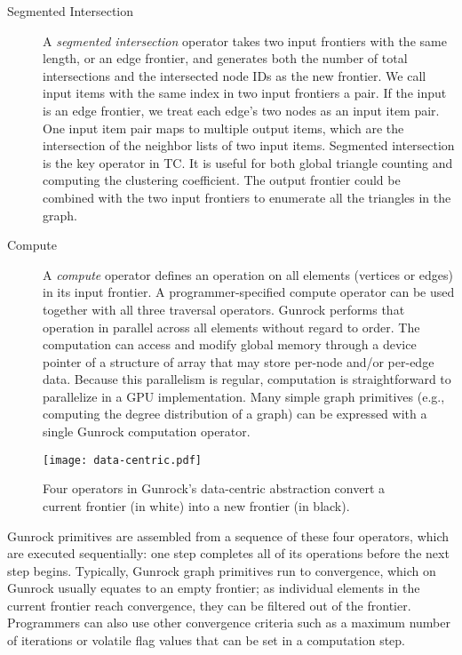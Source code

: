 \documentclass[format=acmsmall,review=false,screen=true]{acmart}
\begin{document}
\begin{description}
\item[Segmented Intersection] A
  \emph{segmented intersection} operator takes two input frontiers
  with the same length, or an edge frontier, and generates both the
  number of total intersections and the intersected node IDs as the
  new frontier. We call input items with the same index in two input
  frontiers a pair. If the input is an edge frontier, we treat each
  edge's two nodes as an input item pair. One input item pair maps to
  multiple output items, which are the intersection of the neighbor
  lists of two input items. Segmented intersection is the key operator
  in TC\@. It is useful for both global triangle counting and
  computing the clustering coefficient. The output frontier could be
  combined with the two input frontiers to enumerate all the triangles
  in the graph.

\item[Compute] A \emph{compute} operator defines an operation on all
  elements (vertices or edges) in its input frontier. A
  programmer-specified compute operator can be used together with all
  three traversal operators. Gunrock performs that operation in
  parallel across all elements without regard to order. The
  computation can access and modify global memory through a device
  pointer of a structure of array that may store per-node and/or
  per-edge data. Because this parallelism is regular, computation is
  straightforward to parallelize in a GPU implementation. Many simple
  graph primitives (e.g., computing the degree distribution of a
  graph) can be expressed with a single Gunrock computation operator.
\end{description}
\begin{figure}
  \centering
  \texttt{[image: data-centric.pdf]}
  \centering
  \caption[Four operators in Gunrock's data-centric abstraction.]{Four
    operators in Gunrock's data-centric abstraction convert a current
    frontier (in white) into a new frontier (in black).}
  \label{fig:data-centric}
\end{figure}

\noindent
Gunrock primitives are assembled from a sequence of these four
operators, which are executed sequentially: one step completes all of
its operations before the next step begins. Typically, Gunrock graph
primitives run to convergence, which on Gunrock usually equates to an
empty frontier; as individual elements in the current frontier reach
convergence, they can be filtered out of the frontier. Programmers can
also use other convergence criteria such as a maximum number of
iterations or volatile flag values that can be set in a computation
step.
\end{document}
